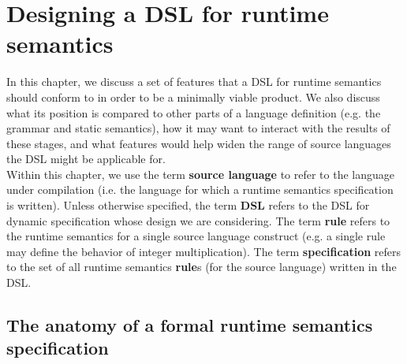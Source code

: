 
\chapter{\label{ch:design}Designing a \acs{DSL} for runtime semantics}


In this chapter, we discuss a set of features that a \ac{DSL} for runtime semantics should conform to in order to be a minimally viable product. We also discuss what its position is compared to other parts of a language definition (e.g. the grammar and static semantics), how it may want to interact with the results of these stages, and what features would help widen the range of source languages the \ac{DSL} might be applicable for.\\

Within this chapter, we use the term \textbf{source language} to refer to the language under compilation (i.e. the language for which a runtime semantics specification is written). Unless otherwise specified, the term \textbf{\ac{DSL}} refers to the \ac{DSL} for dynamic specification whose design we are considering. The term \textbf{rule} refers to the runtime semantics for a single source language construct (e.g. a single rule may define the behavior of integer multiplication). The term \textbf{specification} refers to the set of all runtime semantics \textbf{rule}s (for the source language) written in the \ac{DSL}.

\section{The anatomy of a formal runtime semantics specification}
\label{sec:design_anatomy}

